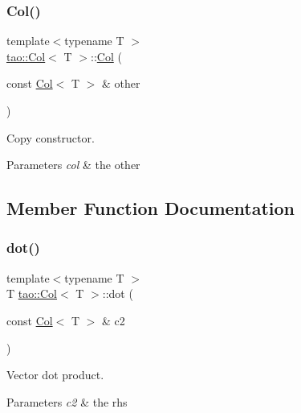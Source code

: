 \subsubsection{\texorpdfstring{Col()}{Col()}\hspace{0.1cm}{\footnotesize\ttfamily [2/2]}}
{\footnotesize\ttfamily template$<$typename T $>$ \\
\mbox{\hyperlink{classtao_1_1_col}{tao\+::\+Col}}$<$ T $>$\+::\mbox{\hyperlink{classtao_1_1_col}{Col}} (\begin{DoxyParamCaption}\item[{const \mbox{\hyperlink{classtao_1_1_col}{Col}}$<$ T $>$ \&}]{other }\end{DoxyParamCaption})}



Copy constructor. 


\begin{DoxyParams}{Parameters}
{\em col} & the other \\
\hline
\end{DoxyParams}


\subsection{Member Function Documentation}
\mbox{\label{classtao_1_1_col_a605b320d536f27395162eff375af8514}} 
\subsubsection{\texorpdfstring{dot()}{dot()}}
{\footnotesize\ttfamily template$<$typename T $>$ \\
T \mbox{\hyperlink{classtao_1_1_col}{tao\+::\+Col}}$<$ T $>$\+::dot (\begin{DoxyParamCaption}\item[{const \mbox{\hyperlink{classtao_1_1_col}{Col}}$<$ T $>$ \&}]{c2 }\end{DoxyParamCaption})}



Vector dot product. 


\begin{DoxyParams}{Parameters}
{\em c2} & the rhs \\
\hline
\end{DoxyParams}
\mbox{\label{classtao_1_1_col_a229cd5a26d1fa4424150329127ca31d5}} 
